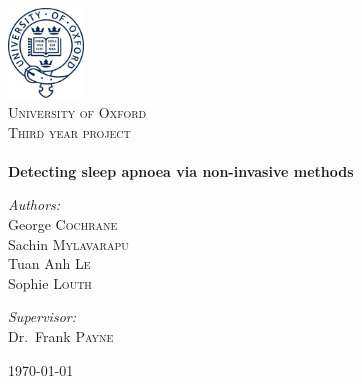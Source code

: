 \begin{titlepage}
\begin{center}

\includegraphics[width=0.15\textwidth]{drawings/oxford.png}~\\[1cm]

\textsc{\LARGE University of Oxford}\\[1.5cm]

\textsc{\Large Third year project}\\[0.5cm]

\HRule \\[0.4cm]
{\huge \bfseries Detecting sleep apnoea via non-invasive methods}
\HRule \\[1.5cm]

\begin{minipage}{0.4\textwidth}
\begin{flushleft} \large
\emph{Authors:}\\
George \textsc{Cochrane}\\
Sachin \textsc{Mylavarapu}\\
Tuan Anh \textsc{Le}\\
Sophie \textsc{Louth}
\end{flushleft}
\end{minipage}
\begin{minipage}{0.4\textwidth}
\begin{flushright} \large
\emph{Supervisor:} \\
Dr.~Frank \textsc{Payne}
\end{flushright}
\end{minipage}

\vfill

{\large \today}

\end{center}
\end{titlepage}